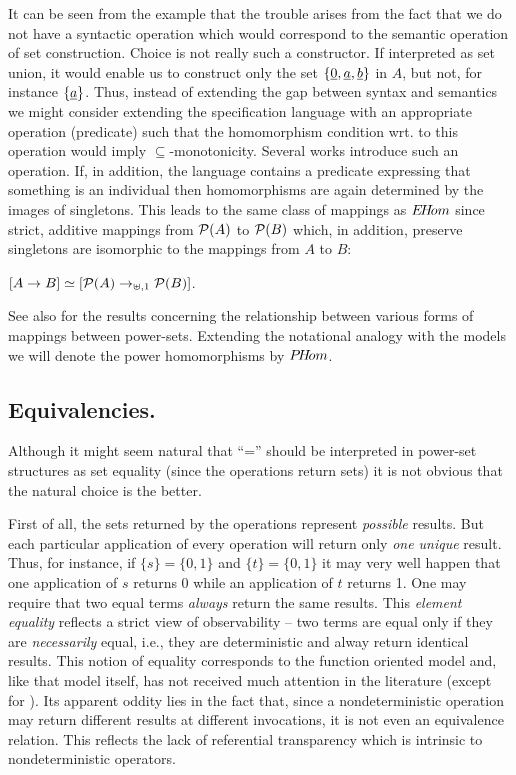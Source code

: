 It can be seen from the example that the trouble arises from the fact 
that we do not have a syntactic operation which would correspond to 
the semantic operation of set construction. Choice is not really such 
a constructor. If interpreted as set union, it would enable us to construct 
only the set $\{\underline{0}, \underline{a}, \underline{b}\}$ in $A$, but not, for instance 
$\{\underline{a}\}$. Thus, 
instead of extending the gap between syntax and semantics we might 
consider extending the specification language with an appropriate 
operation (predicate) such that the 
homomorphism condition wrt. to this operation would imply 
$\subseteq$-monotonicity. Several works \cite{c:77, c:59, c:87, c:91} introduce such an 
operation. If, in addition, the language contains a predicate 
expressing that something is an individual \cite{c:91} then homomorphisms 
are again determined by the images of singletons. This leads to
 the same class of mappings as $E\!H\!om$ since strict, additive mappings 
from ${\cal P}(A)$ to ${\cal P}(B)$ which, in addition, preserve singletons 
are isomorphic to the mappings from $A$ to $B$:
\begin{Claim} 
$[A\mathrel{\rightarrow} B]\mathrel{\simeq} [{\cal P}(A)\mathrel{\rightarrow}_{\uplus,1}{\cal P}(B)]$.
\end{Claim} 
See also \cite{c:102, c:106} for the 
results concerning the relationship between various forms of mappings 
between power-sets. Extending the notational analogy with the models 
we will denote the power homomorphisms by $P\!H\!om$.


\subsection{Equivalencies.}\label{sub:equiv}
Although it might seem natural that 
``='' should be interpreted in power-set structures as set equality 
(since the operations return sets) it is not obvious that the natural 
choice is the better.

First of all, the sets returned by 
the operations represent {\em possible} results. But each particular 
application of every operation will return only {\em one unique} 
result. Thus, for instance, if $\{s\}=\{0,1\}$ and $\{t\}=\{0,1\}$
 it may very well happen that one 
application of $s$ returns 0 while an application of $t$ 
returns 1. One may require that two equal terms {\em always} return 
the same results. This {\em element equality}
 reflects a strict view of observability  --   two terms are equal 
only if they are {\em necessarily} equal, i.e.,
 they are deterministic and alway return identical results. This 
notion of equality corresponds to the function oriented model and, 
like that model itself, has not received much attention in the 
literature (except for \cite{c:127, c:133, c:130}). Its apparent oddity 
lies in the fact that, since a nondeterministic operation may return 
different results at different invocations, it is not even an 
equivalence relation. This reflects the lack of referential 
transparency which is intrinsic to nondeterministic operators.

